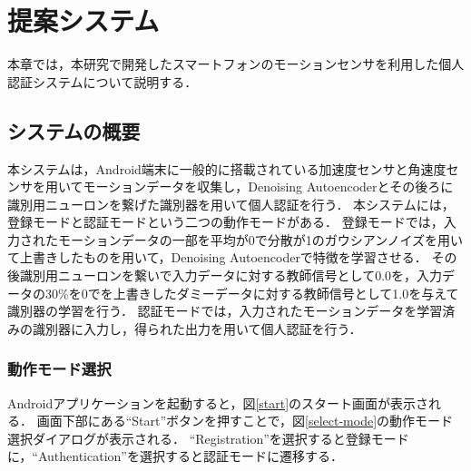 \chapter{提案システム}
本章では，本研究で開発したスマートフォンのモーションセンサを利用した個人認証システムについて説明する．

\section{システムの概要}
本システムは，Android端末に一般的に搭載されている加速度センサと角速度センサを用いてモーションデータを収集し，Denoising Autoencoderとその後ろに識別用ニューロンを繋げた識別器を用いて個人認証を行う．
本システムには，登録モードと認証モードという二つの動作モードがある．
登録モードでは，入力されたモーションデータの一部を平均が0で分散が1のガウシアンノイズを用いて上書きしたものを用いて，Denoising Autoencoderで特徴を学習させる．
その後識別用ニューロンを繋いで入力データに対する教師信号として0.0を，入力データの30\%を0でを上書きしたダミーデータに対する教師信号として1.0を与えて識別器の学習を行う．
認証モードでは，入力されたモーションデータを学習済みの識別器に入力し，得られた出力を用いて個人認証を行う．

\subsection{動作モード選択}
Androidアプリケーションを起動すると，図\ref{start}のスタート画面が表示される．
画面下部にある``Start''ボタンを押すことで，図\ref{select-mode}の動作モード選択ダイアログが表示される．
``Registration''を選択すると登録モードに，``Authentication''を選択すると認証モードに遷移する．

